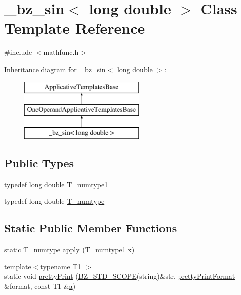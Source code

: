 \hypertarget{class__bz__sin_3_01long_01double_01_4}{}\section{\+\_\+bz\+\_\+sin$<$ long double $>$ Class Template Reference}
\label{class__bz__sin_3_01long_01double_01_4}


{\ttfamily \#include $<$mathfunc.\+h$>$}

Inheritance diagram for \+\_\+bz\+\_\+sin$<$ long double $>$\+:\begin{figure}[H]
\begin{center}
\leavevmode
\includegraphics[height=3.000000cm]{class__bz__sin_3_01long_01double_01_4}
\end{center}
\end{figure}
\subsection*{Public Types}
\begin{DoxyCompactItemize}
\item 
typedef long double \hyperlink{class__bz__sin_3_01long_01double_01_4_a5a6ea4d3a211d1a2e4e8e0cda814dde4}{T\+\_\+numtype1}
\item 
typedef long double \hyperlink{class__bz__sin_3_01long_01double_01_4_aeeda88d2d7131b5142a82295037ddd62}{T\+\_\+numtype}
\end{DoxyCompactItemize}
\subsection*{Static Public Member Functions}
\begin{DoxyCompactItemize}
\item 
static \hyperlink{class__bz__sin_3_01long_01double_01_4_aeeda88d2d7131b5142a82295037ddd62}{T\+\_\+numtype} \hyperlink{class__bz__sin_3_01long_01double_01_4_a26ab3f085c0cb50322876da3204144e6}{apply} (\hyperlink{class__bz__sin_3_01long_01double_01_4_a5a6ea4d3a211d1a2e4e8e0cda814dde4}{T\+\_\+numtype1} \hyperlink{vecnorm1_8cc_ac73eed9e41ec09d58f112f06c2d6cb63}{x})
\item 
{\footnotesize template$<$typename T1 $>$ }\\static void \hyperlink{class__bz__sin_3_01long_01double_01_4_a9532c9204b895eb239ecc58ce54297ed}{pretty\+Print} (\hyperlink{numinquire_8h_a2b24ffc3b4ef9803956bc7715c6c7b83}{B\+Z\+\_\+\+S\+T\+D\+\_\+\+S\+C\+O\+P\+E}(string)\&str, \hyperlink{classprettyPrintFormat}{pretty\+Print\+Format} \&format, const T1 \&\hyperlink{gen__mat5files_8m_aae328bf20413f220e38aec4d95bfd6da}{a})
\end{DoxyCompactItemize}


